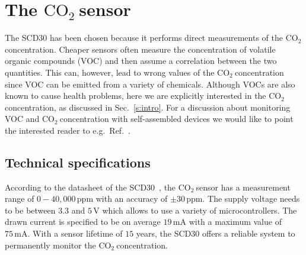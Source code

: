\documentclass[12pt,a4paper]{article}
\newcommand{\coo}{\ensuremath{\mathrm{CO_2}~}}
\begin{document}
\section{The \coo sensor}\label{s:SCD30}
The SCD30 has been chosen because it performs direct measurements of the \coo concentration. Cheaper sensors often measure the concentration of volatile organic compounds (VOC) and then assume a correlation between the two quantities. This can, however, lead to wrong values of the \coo concentration since VOC can be emitted from a variety of chemicals. Although VOCs are also known to cause health problems, here we are explicitly interested in the \coo concentration, as discussed in Sec.~\ref{s:intro}. For a discussion about monitoring VOC and \coo concentration with self-assembled devices we would like to point the interested reader 
to e.g.\ Ref.~\cite{CHIESA2019}.

\subsection{Technical specifications}
According to the datasheet of the SCD30~\cite{SENSIRION2020B}, the \coo sensor has a measurement range of $0 - 40,000\,\mathrm{ppm}$ with an accuracy of $\pm 30\,\mathrm{ppm}$.
The supply voltage needs to be between $3.3$ and $5\,\mathrm{V}$ which allows to use a variety of microcontrollers. The drawn current is specified to be on average $19\,\mathrm{mA}$ with a maximum value of $75\,\mathrm{mA}$. With a sensor lifetime of $15$ years, the SCD30 offers a reliable system to permanently monitor the \coo concentration.
\end{document}
